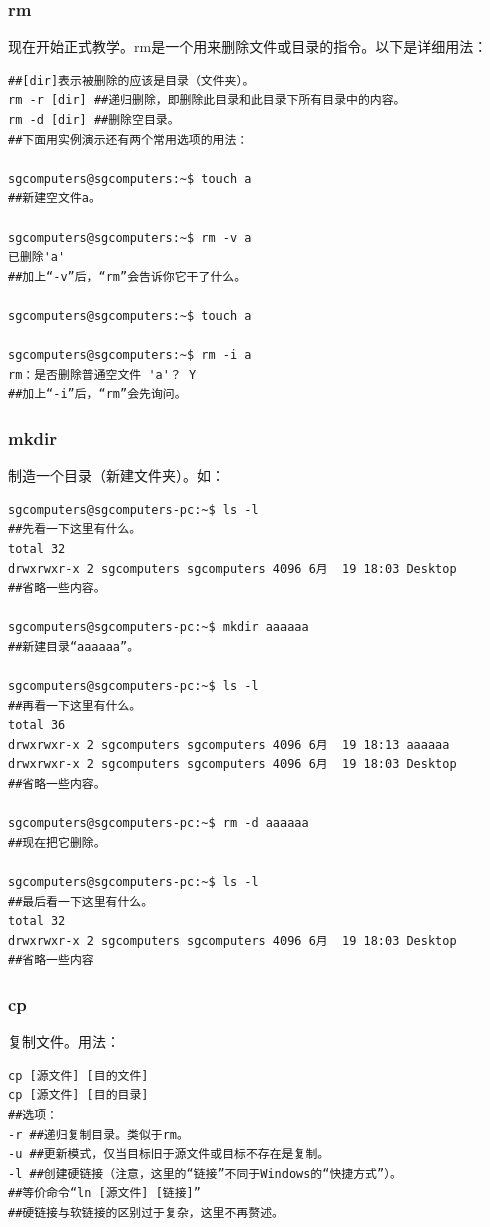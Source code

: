 \documentclass{book}
\begin{document}
\subsubsection{rm}
{\color{red}{警告！这是一个删除命令！这个命令的不正确操作可能会对操作系统产生不可逆的致命破坏！如果可行，请使用图形界面！}}\par
\cite{manrm} 现在开始正式教学。rm是一个用来删除文件或目录的指令。以下是详细用法：
\begin{verbatim}
##[dir]表示被删除的应该是目录（文件夹）。
rm -r [dir] ##递归删除，即删除此目录和此目录下所有目录中的内容。
rm -d [dir] ##删除空目录。
##下面用实例演示还有两个常用选项的用法：

sgcomputers@sgcomputers:~$ touch a
##新建空文件a。

sgcomputers@sgcomputers:~$ rm -v a
已删除'a'
##加上“-v”后，“rm”会告诉你它干了什么。

sgcomputers@sgcomputers:~$ touch a

sgcomputers@sgcomputers:~$ rm -i a
rm：是否删除普通空文件 'a'？ Y
##加上“-i”后，“rm”会先询问。

\end{verbatim}
\subsubsection{mkdir}
制造一个目录（新建文件夹）。如：
\begin{verbatim}
sgcomputers@sgcomputers-pc:~$ ls -l
##先看一下这里有什么。
total 32
drwxrwxr-x 2 sgcomputers sgcomputers 4096 6月  19 18:03 Desktop
##省略一些内容。

sgcomputers@sgcomputers-pc:~$ mkdir aaaaaa
##新建目录“aaaaaa”。

sgcomputers@sgcomputers-pc:~$ ls -l
##再看一下这里有什么。
total 36
drwxrwxr-x 2 sgcomputers sgcomputers 4096 6月  19 18:13 aaaaaa
drwxrwxr-x 2 sgcomputers sgcomputers 4096 6月  19 18:03 Desktop
##省略一些内容。

sgcomputers@sgcomputers-pc:~$ rm -d aaaaaa
##现在把它删除。

sgcomputers@sgcomputers-pc:~$ ls -l
##最后看一下这里有什么。
total 32
drwxrwxr-x 2 sgcomputers sgcomputers 4096 6月  19 18:03 Desktop
##省略一些内容
\end{verbatim}
\subsubsection{cp}
复制文件。用法：
\begin{verbatim}
cp [源文件] [目的文件]
cp [源文件] [目的目录]
##选项：
-r ##递归复制目录。类似于rm。
-u ##更新模式，仅当目标旧于源文件或目标不存在是复制。
-l ##创建硬链接（注意，这里的“链接”不同于Windows的“快捷方式”）。
##等价命令“ln [源文件] [链接]”
##硬链接与软链接的区别过于复杂，这里不再赘述。
\end{verbatim}
\end{document}
